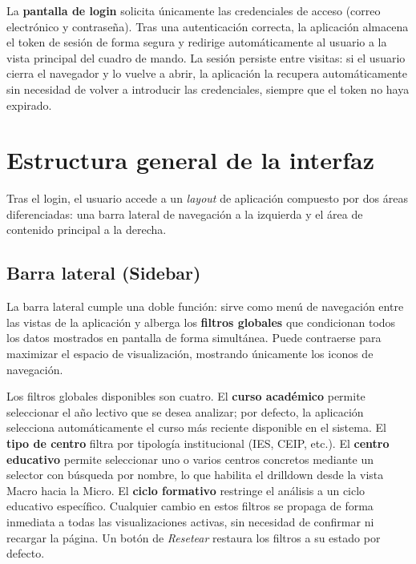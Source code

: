 La \textbf{pantalla de login} solicita únicamente las credenciales de acceso (correo electrónico y contraseña). Tras una autenticación correcta, la aplicación almacena el token de sesión de forma segura y redirige automáticamente al usuario a la vista principal del cuadro de mando. La sesión persiste entre visitas: si el usuario cierra el navegador y lo vuelve a abrir, la aplicación la recupera automáticamente sin necesidad de volver a introducir las credenciales, siempre que el token no haya expirado.

\section{Estructura general de la interfaz}

Tras el login, el usuario accede a un \textit{layout} de aplicación compuesto por dos áreas diferenciadas: una barra lateral de navegación a la izquierda y el área de contenido principal a la derecha.

\subsection{Barra lateral (Sidebar)}

La barra lateral cumple una doble función: sirve como menú de navegación entre las vistas de la aplicación y alberga los \textbf{filtros globales} que condicionan todos los datos mostrados en pantalla de forma simultánea. Puede contraerse para maximizar el espacio de visualización, mostrando únicamente los iconos de navegación.

Los filtros globales disponibles son cuatro. El \textbf{curso académico} permite seleccionar el año lectivo que se desea analizar; por defecto, la aplicación selecciona automáticamente el curso más reciente disponible en el sistema. El \textbf{tipo de centro} filtra por tipología institucional (IES, CEIP, etc.). El \textbf{centro educativo} permite seleccionar uno o varios centros concretos mediante un selector con búsqueda por nombre, lo que habilita el drilldown desde la vista Macro hacia la Micro. El \textbf{ciclo formativo} restringe el análisis a un ciclo educativo específico. Cualquier cambio en estos filtros se propaga de forma inmediata a todas las visualizaciones activas, sin necesidad de confirmar ni recargar la página. Un botón de \textit{Resetear} restaura los filtros a su estado por defecto.


